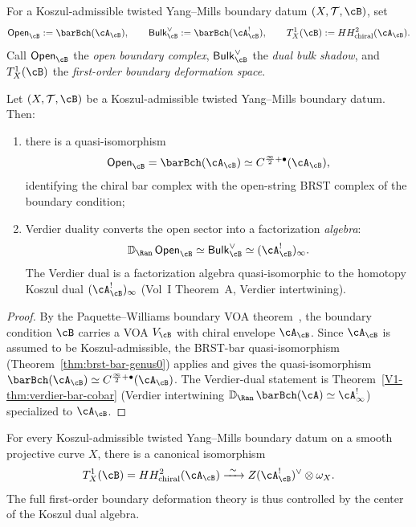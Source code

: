 \begin{notation}
\label{not:twisted-ym-boundary-objects}
For a Koszul-admissible twisted Yang--Mills boundary datum $(X,\mathcal{T},\cB)$, set
\[
\mathsf{Open}_{\cB} := \barBch(\cA_{\cB}),
\qquad
\mathsf{Bulk}^{\vee}_{\cB} := \barBch(\cA_{\cB}^!),
\qquad
T^1_X(\cB) := HH^2_{\mathrm{chiral}}(\cA_{\cB}).
\]
Call $\mathsf{Open}_{\cB}$ the \emph{open boundary complex}, $\mathsf{Bulk}^{\vee}_{\cB}$ the
\emph{dual bulk shadow}, and $T^1_X(\cB)$ the \emph{first-order boundary deformation space}.
\end{notation}

\begin{theorem}
\label{thm:twisted-ym-boundary-brst}
Let $(X,\mathcal{T},\cB)$ be a Koszul-admissible twisted Yang--Mills boundary datum.
Then:
\begin{enumerate}[label=(\alph*)]
\item there is a quasi-isomorphism
\[
\mathsf{Open}_{\cB} = \barBch(\cA_{\cB}) \simeq C^{\frac{\infty}{2}+\bullet}(\cA_{\cB}),
\]
identifying the chiral bar complex with the open-string BRST complex of the boundary condition;
\item Verdier duality converts the open sector into a factorization \emph{algebra}:
\[
\mathbb{D}_{\Ran}\, \mathsf{Open}_{\cB} \simeq \mathsf{Bulk}^{\vee}_{\cB} \simeq (\cA_{\cB}^!)_\infty.
\]
The Verdier dual is a factorization algebra quasi-isomorphic to the homotopy Koszul dual $(\cA_{\cB}^!)_\infty$ (Vol~I Theorem~A, Verdier intertwining).
\end{enumerate}
\end{theorem}

\begin{proof}
By the Paquette--Williams boundary VOA theorem~{\cite{PW22}}, the boundary condition $\cB$ carries a
VOA $V_{\cB}$ with chiral envelope $\cA_{\cB}$. Since $\cA_{\cB}$ is assumed to be
Koszul-admissible, the BRST-bar quasi-isomorphism (Theorem~\ref{thm:brst-bar-genus0}) applies and gives the quasi-isomorphism
$\barBch(\cA_{\cB}) \simeq C^{\frac{\infty}{2}+\bullet}(\cA_{\cB})$. The Verdier-dual statement is
Theorem~\ref{V1-thm:verdier-bar-cobar} (Verdier intertwining $\mathbb{D}_{\Ran}\, \barBch(\cA) \simeq \cA^!_\infty$) specialized to $\cA_{\cB}$.
\end{proof}

\begin{theorem}
\label{thm:twisted-ym-tangent-center}
For every Koszul-admissible twisted Yang--Mills boundary datum on a smooth projective
curve $X$, there is a canonical isomorphism
\[
T^1_X(\cB)
= HH^2_{\mathrm{chiral}}(\cA_{\cB})
\xrightarrow{\ \sim\ }
Z(\cA_{\cB}^!)^{\vee} \otimes \omega_X.
\]
The full first-order boundary deformation theory is thus controlled by the center
of the Koszul dual algebra.
\end{theorem}

